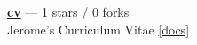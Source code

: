 \item \href{https://github.com/jpdeleon/cv}{{\bf cv}} --- 1 stars / 0 forks \\
Jerome's Curriculum Vitae \href{https://raw.githubusercontent.com/jpdeleon/cv/main-pdf/tex/cv_pubs.pdf}{[docs]}